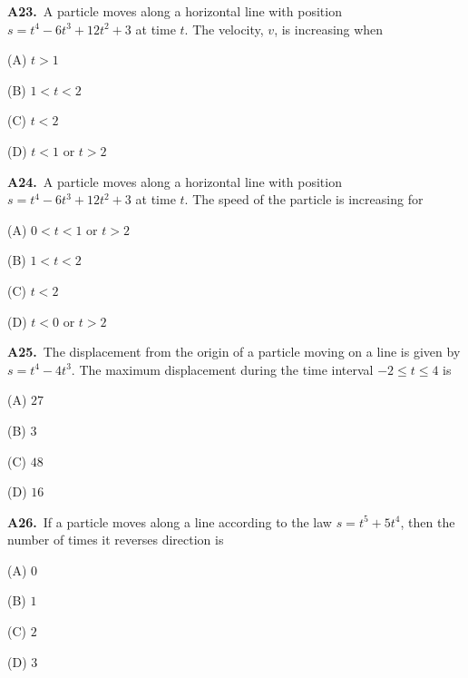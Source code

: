 \documentclass[11pt]{article}
\begin{document}
\bigskip\noindent\textbf{A23.}\ A particle moves along a horizontal line with position $s=t^4-6t^3+12t^2+3$ at time $t$. The velocity, $v$, is increasing when
\begin{list}{}{\setlength{\leftmargin}{3em}\setlength{\labelwidth}{2.5em}\setlength{\itemsep}{0pt}\setlength{\topsep}{2pt}}
\item[(A)] $t>1$
\item[(B)] $1<t<2$
\item[(C)] $t<2$
\item[(D)] $t<1$ or $t>2$
\end{list}

\bigskip\noindent\textbf{A24.}\ A particle moves along a horizontal line with position $s=t^4-6t^3+12t^2+3$ at time $t$. The speed of the particle is increasing for
\begin{list}{}{\setlength{\leftmargin}{3em}\setlength{\labelwidth}{2.5em}\setlength{\itemsep}{0pt}\setlength{\topsep}{2pt}}
\item[(A)] $0<t<1$ or $t>2$
\item[(B)] $1<t<2$
\item[(C)] $t<2$
\item[(D)] $t<0$ or $t>2$
\end{list}

\bigskip\noindent\textbf{A25.}\ The displacement from the origin of a particle moving on a line is given by $s = t^4-4t^3$. The maximum displacement during the time interval $-2 \leq t \leq 4$ is
\begin{list}{}{\setlength{\leftmargin}{3em}\setlength{\labelwidth}{2.5em}\setlength{\itemsep}{0pt}\setlength{\topsep}{2pt}}
\item[(A)] $27$
\item[(B)] $3$
\item[(C)] $48$
\item[(D)] $16$
\end{list}

\bigskip\noindent\textbf{A26.}\ If a particle moves along a line according to the law $s = t^5+5t^4$, then the number of times it reverses direction is
\begin{list}{}{\setlength{\leftmargin}{3em}\setlength{\labelwidth}{2.5em}\setlength{\itemsep}{0pt}\setlength{\topsep}{2pt}}
\item[(A)] $0$
\item[(B)] $1$
\item[(C)] $2$
\item[(D)] $3$
\end{list}
\end{document}
